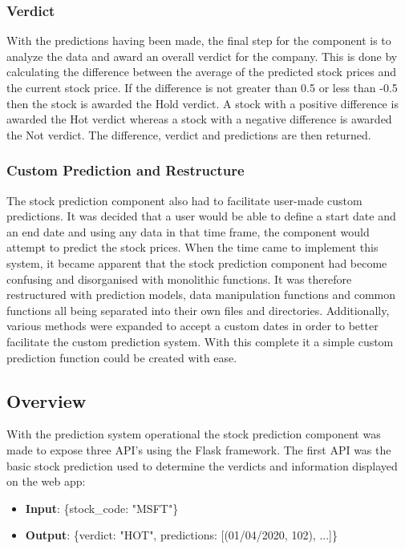             \subsubsection{Verdict}\label{Verdict} With the predictions having been made, the final step for the component is to analyze the data and award an overall verdict for the company. This is done by calculating the difference between the average of the predicted stock prices and the current stock price. If the difference is not greater than 0.5 or less than -0.5 then the stock is awarded the Hold verdict. A stock with a positive difference is awarded the Hot verdict whereas a stock with a negative difference is awarded the Not verdict. The difference, verdict and predictions are then returned. 
            
            \subsubsection{Custom Prediction and Restructure}
            The stock prediction component also had to facilitate user-made custom predictions. It was decided that a user would be able to define a start date and an end date and using any data in that time frame, the component would attempt to predict the stock prices. When the time came to implement this system, it became apparent that the stock prediction component had become confusing and disorganised with monolithic functions. It was therefore restructured with prediction models, data manipulation functions and common functions all being separated into their own files and directories. Additionally, various methods were expanded to accept a custom dates in order to better facilitate the custom prediction system. With this complete it a simple custom prediction function could be created with ease.

            \subsection{Overview} With the prediction system operational the stock prediction component was made to expose three API's using the Flask framework. The first API was the basic stock prediction used to determine the verdicts and information displayed on the web app:
            
            \begin{itemize}
                \item \textbf{Input}: \{stock\_code: "MSFT"\}
                \item \textbf{Output}: \{verdict: "HOT", predictions: [(01/04/2020, 102), ...]\}
            \end{itemize}
            
